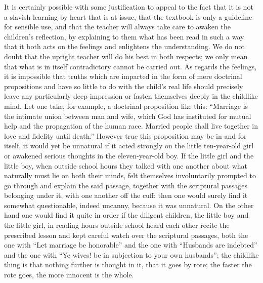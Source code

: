 \documentclass[12pt,a4paper,openany]{book}
\newcommand{\opage}[1]{\marginnote{\footnotesize\textit{[#1]}}}
\begin{document}
It is certainly possible with some justification to appeal
to the fact that it is not a slavish learning by heart that is at issue,
that the textbook is only a guideline for sensible
use, and that the teacher will always take care
to awaken the children's reflection, by explaining to them
what has been read in such a way that it both acts on the feelings
and enlightens the understanding. We do not doubt that the
upright teacher will do his best in both respects;
we only mean that what is in itself contradictory
cannot be carried out. As regards the feelings, it is
impossible that truths which are imparted in the form of mere
doctrinal propositions and have so little to do with the child's real
life should precisely leave any particularly deep
impression or fasten themselves deeply in the childlike mind. Let one
take, for example, a doctrinal proposition like this: ``Marriage
is the intimate union between man and wife,
which God has instituted for mutual help and the propagation
of the human race. Married people shall live together
in love and fidelity until death.'' However true this
proposition may be in and for itself, it would yet
be unnatural if it acted strongly on the little
ten-year-old girl or awakened serious thoughts in the eleven-year-old
boy. If the little girl and the little boy,
when outside school hours they talked with one another about what
\setcounter{footnote}{0}%
\opage{314}naturally must lie on both their minds, felt
themselves involuntarily prompted to go through and explain
the said passage, together with the scriptural passages belonging under it,
with one another off the cuff: then one would surely
find it somewhat questionable, indeed uncanny, because it was
unnatural. On the other hand one would find it quite in order
if the diligent children, the little boy and the little
girl, in reading hours outside school heard each other recite
the prescribed lesson and kept careful watch over the scriptural passages,
both the one with ``Let marriage be honorable'' and
the one with ``Husbands are indebted'' and the one with ``Ye wives!
be in subjection to your own husbands''; the childlike thing
is that nothing further is thought in it, that it goes
by rote; the faster the rote goes, the more innocent
is the whole.
\end{document}
